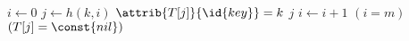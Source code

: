 \begin{codebox}
\li $i \gets 0$
\li \Repeat 
\li     $j \gets h(k,i)$
\li     \If $\attrib{T[j]}{\id{key}} = k$
\li         \Then
                \Return $j$
            \End
\li     $i \gets i + 1$
\li \Until $(i = m)$  $(T[j] = \const{nil})$
\li \Return {}
\end{codebox}